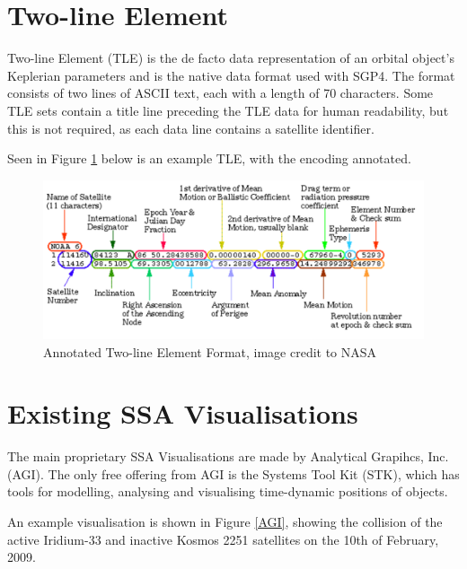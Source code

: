 \documentclass[12pt,openany,a4paper]{book}
\begin{document}
	
		\section{Two-line Element}
		
		Two-line Element (TLE) is the de facto data representation of an orbital object's Keplerian parameters and is the native data format used with SGP4. The format consists of two lines of ASCII text, each with a length of 70 characters. Some TLE sets contain a title line preceding the TLE data for human readability, but this is not required, as each data line contains a satellite identifier. \newline
		
		Seen in Figure \ref{TLE} below is an example TLE, with the encoding annotated.
		
		\begin{figure}[H]
			\centering
			\caption{Annotated Two-line Element Format, image credit to NASA\cite{NASAtle}}
			\label{TLE}
			\includegraphics[scale=0.5]{TLE.png}
		\end{figure}
		
		
				
		\section{Existing SSA Visualisations}
		The main proprietary SSA Visualisations are made by Analytical Grapihcs, Inc. (AGI). The only free offering from AGI is the Systems Tool Kit (STK), which has tools for modelling, analysing and visualising time-dynamic positions of objects. \newline
		
		An example visualisation is shown in Figure \ref{AGI}, showing the collision of the active Iridium-33 and inactive Kosmos 2251 satellites on the 10th of February, 2009. \newline
\end{document}
